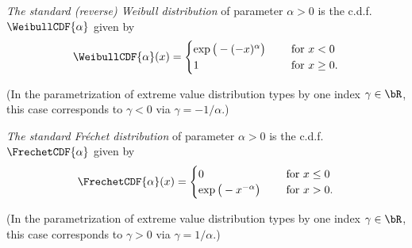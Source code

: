\begin{definition}
  \label{def:std-Weibull-cdf}
  \emph{The standard (reverse) Weibull distribution} of parameter
  $\alpha > 0$ is the c.d.f. $\WeibullCDF{\alpha}$ given by
  \begin{align*}
  \WeibullCDF{\alpha} (x) = \begin{cases}
      \exp \big( - (-x)^\alpha \big) \quad & \text{ for } x < 0 \\
      1 \quad & \text{ for } x \ge 0 .
    \end{cases}
  \end{align*}

  (In the parametrization of extreme value distribution types by one
  index $\gamma \in \bR$, this case corresponds to $\gamma < 0$
  via $\gamma = -1/\alpha$.)
\end{definition}

\begin{definition}
  \label{def:std-Frechet-cdf}
  \emph{The standard Fr\'echet distribution} of parameter $\alpha > 0$
  is the c.d.f. $\FrechetCDF{\alpha}$ given by
  \begin{align*}
  \FrechetCDF{\alpha} (x) = \begin{cases}
    0 \quad & \text{ for } x \le 0 \\
    \exp \big( - x^{-\alpha} \big) \quad & \text{ for } x > 0 .
    \end{cases}
  \end{align*}

  (In the parametrization of extreme value distribution types by one
  index $\gamma \in \bR$, this case corresponds to $\gamma > 0$
  via $\gamma = 1/\alpha$.)
\end{definition}

